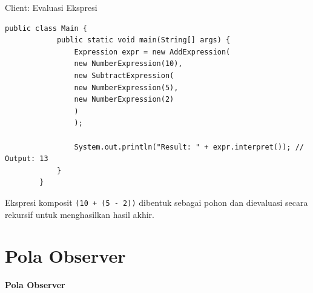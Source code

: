 \documentclass[aspectratio=169, table]{beamer}
\begin{document}
\begin{frame}[fragile]{Client: Evaluasi Ekspresi}
	\begin{lstlisting}[style=JavaStyle]
		public class Main {
			public static void main(String[] args) {
				Expression expr = new AddExpression(
				new NumberExpression(10),
				new SubtractExpression(
				new NumberExpression(5),
				new NumberExpression(2)
				)
				);
				
				System.out.println("Result: " + expr.interpret()); // Output: 13
			}
		}
	\end{lstlisting}
	\small
	Ekspresi komposit \texttt{(10 + (5 - 2))} dibentuk sebagai pohon dan dievaluasi secara rekursif untuk menghasilkan hasil akhir.
\end{frame}

\section{Pola Observer}

\begin{frame}{\hfill}
	\centering
	\textbf{\Huge{Pola Observer}}
\end{frame}
\end{document}

